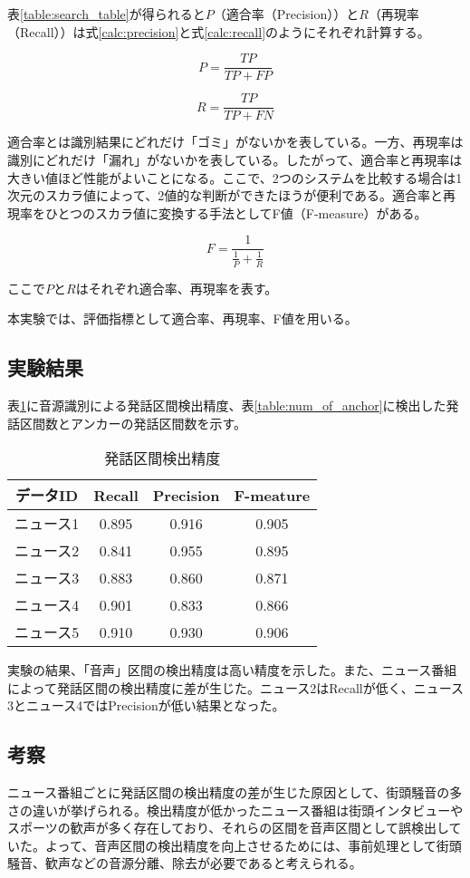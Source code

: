 表\ref{table:search_table}が得られると$P$（適合率（Precision））と$R$（再現率（Recall））は式\ref{calc:precision}と式\ref{calc:recall}のようにそれぞれ計算する。

\begin{equation}
\label{calc:precision}
P = \frac{TP}{TP + FP}
\end{equation}

\begin{equation}
\label{calc:recall}
R = \frac{TP}{TP + FN}
\end{equation}

適合率とは識別結果にどれだけ「ゴミ」がないかを表している。一方、再現率は識別にどれだけ「漏れ」がないかを表している。したがって、適合率と再現率は大きい値ほど性能がよいことになる。ここで、2つのシステムを比較する場合は1次元のスカラ値によって、2値的な判断ができたほうが便利である。適合率と再現率をひとつのスカラ値に変換する手法としてF値（F-measure）がある。

\begin{equation}
\label{calc:fmeasure}
F = \frac{1}{\frac{1}{P} + \frac{1}{R}}
\end{equation}

ここで$P$と$R$はそれぞれ適合率、再現率を表す。\par
本実験では、評価指標として適合率、再現率、F値を用いる。
\subsection{実験結果}
表\ref{table:test_detail_RPF}に音源識別による発話区間検出精度、表\ref{table:num_of_anchor}に検出した発話区間数とアンカーの発話区間数を示す。

\begin{table}[H]
  \begin{center}
    \caption{発話区間検出精度 \label{table:test_detail_RPF}}
    \begin{tabular}{|c||c|c|c|} \hline
      データID & Recall & Precision & F-meature \\ \hline
      ニュース1 & 0.895 & 0.916 & 0.905 \\ \hline
      ニュース2 & 0.841 & 0.955 & 0.895\\ \hline
      ニュース3 & 0.883 & 0.860 & 0.871 \\ \hline
      ニュース4 & 0.901 & 0.833 & 0.866\\ \hline
      ニュース5 & 0.910 & 0.930 & 0.906\\ \hline
    \end{tabular}
  \end{center}
\end{table}


実験の結果、「音声」区間の検出精度は高い精度を示した。また、ニュース番組によって発話区間の検出精度に差が生じた。ニュース2はRecallが低く、ニュース3とニュース4ではPrecisionが低い結果となった。

\subsection{考察}
ニュース番組ごとに発話区間の検出精度の差が生じた原因として、街頭騒音の多さの違いが挙げられる。検出精度が低かったニュース番組は街頭インタビューやスポーツの歓声が多く存在しており、それらの区間を音声区間として誤検出していた。よって、音声区間の検出精度を向上させるためには、事前処理として街頭騒音、歓声などの音源分離、除去が必要であると考えられる。\par
